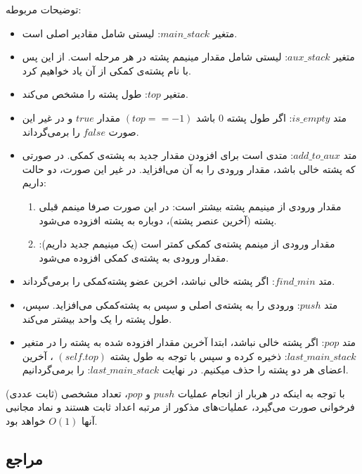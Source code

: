 \documentclass[]{article}
\begin{document}
\pagebreak
توضیحات مربوطه:
\begin{itemize}
    \item متغیر $main\_stack$:
    لیستی شامل مقادیر اصلی است.

    \item متغیر $aux\_stack$:
    لیستی شامل مقدار مینیمم پشته در هر مرحله است. از این پس با نام پشته‌ی کمکی از آن یاد خواهیم کرد.

    \item متغیر $top$:
    طول پشته را مشخص می‌کند.

    \item متد $is\_empty$:
    اگر طول پشته $0$ باشد
    $(top == -1)$
    ‌ مقدار 
    $true$ 
    و در غیر این صورت 
    $false$
    را برمی‌گرداند.

    \item متد $add\_to\_aux$:
    متدی است برای افزودن مقدار جدید به پشته‌ی کمکی. در صورتی که پشته خالی باشد، مقدار ورودی را به آن می‌افزاید. در غیر این صورت، دو حالت داریم:
        \begin{enumerate}
            \item مقدار ورودی از مینیمم پشته بیشتر است: در این صورت صرفا مینمم قبلی پشته (آخرین عنصر پشته)، دوباره به پشته افزوده می‌شود. 
            \item مقدار ورودی از مینمم پشته‌ی کمکی کمتر است (یک مینیمم جدید داریم): مقدار ورودی به پشته‌ی کمکی افزوده می‌شود.
        \end{enumerate}
    \item متد $find\_min$:
    اگر پشته خالی نباشد، اخرین عضو پشته‌کمکی را برمی‌گرداند.

    \item متد $push$:
    ورودی را به پشته‌ی اصلی و سپس به پشته‌کمکی می‌افزاید‌. سپس، طول پشته را یک واحد بیشتر می‌کند.
    \item متد $pop$:
    اگر پشته خالی نباشد، ابتدا آخرین مقدار افزوده شده به پشته را در متغیر
    $last\_main\_stack$:
    ذخیره کرده و سپس با توجه به طول پشته 
    $(self.top)$
    ، آخرین اعضای هر دو پشته را حذف میکنیم. در نهایت 
    $last\_main\_stack$:
    را برمی‌گردانیم.
\end{itemize}

با توجه به اینکه در هربار از انجام عملیات
$push$ 
و 
$pop$،
تعداد مشخصی (ثابت عددی) فرخوانی صورت می‌گیرد، عملیات‌های مذکور از مرتبه اعداد ثابت هستند و نماد مجانبی آنها 
$O(1)$
خواهد بود.

\subsection*{مراجع}
\end{document}
